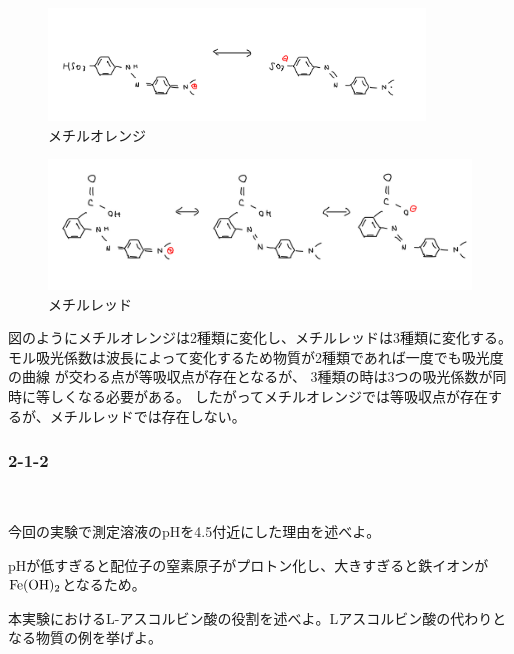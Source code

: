 \documentclass[a4paper,papersize,dvipdfmx]{jsarticle}
\begin{document}
\begin{figure}
\begin{center}
\includegraphics[clip, width=10cm]{imgs/mo.jpeg}
\caption{メチルオレンジ}
\end{center}
\end{figure}


\begin{figure}
\begin{center}
\includegraphics[clip, width=14cm]{imgs/mr.jpeg}
\caption{メチルレッド}
\end{center}
\end{figure}

図のようにメチルオレンジは2種類に変化し、メチルレッドは3種類に変化する。
モル吸光係数は波長によって変化するため物質が2種類であれば一度でも吸光度の曲線
が交わる点が等吸収点が存在となるが、
3種類の時は3つの吸光係数が同時に等しくなる必要がある。
したがってメチルオレンジでは等吸収点が存在するが、メチルレッドでは存在しない。


\subsubsection*{2-1-2}

\

\begin{tcolorbox}[colback=white,colbacktitle=black!10!white,coltitle=black,title={1}]
今回の実験で測定溶液のpHを4.5付近にした理由を述べよ。
\end{tcolorbox}

pHが低すぎると配位子の窒素原子がプロトン化し、大きすぎると鉄イオンが$\rm Fe(OH)_2$となるため。


\begin{tcolorbox}[colback=white,colbacktitle=black!10!white,coltitle=black,title={2}]
本実験におけるL-アスコルビン酸の役割を述べよ。Lアスコルビン酸の代わりとなる物質の例を挙げよ。
\end{tcolorbox}
\end{document}
